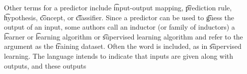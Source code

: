 Other terms for a predictor include \t{input-output} mapping, \t{prediction rule}, \t{hypothesis}, \t{concept}, or \t{classifier}.
Since a predictor can be used to \t{guess} the output of an input, some authors call an inductor (or family of inductors) a \t{learner} or \t{learning algorithm} or \t{supervised learning algorithm} and refer to the argument as the \t{training dataset}.
Often the word  is included, as in \t{supervised learning}.
The language intends to indicate that inputs are given along with outputs, and these outputs 
